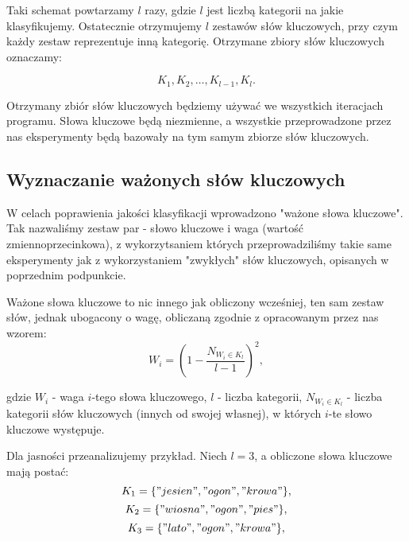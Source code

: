 \documentclass{classrep}
\begin{document}
Taki schemat powtarzamy $l$ razy, gdzie $l$ jest liczbą kategorii na jakie klasyfikujemy. Ostatecznie otrzymujemy $l$ zestawów słów kluczowych, przy czym każdy zestaw reprezentuje inną kategorię. Otrzymane zbiory słów kluczowych oznaczamy:

\begin{equation}
            K_{1}, K_{2}, \ldots , K_{l-1}, K_{l}.
 \end{equation}	

Otrzymany zbiór słów kluczowych będziemy używać we wszystkich iteracjach programu. Słowa kluczowe będą niezmienne, a wszystkie przeprowadzone przez nas eksperymenty będą bazowały na tym samym zbiorze słów kluczowych.

\subsection{Wyznaczanie ważonych słów kluczowych}

W celach poprawienia jakości klasyfikacji wprowadzono "ważone słowa kluczowe". Tak nazwaliśmy zestaw par - słowo kluczowe i waga (wartość zmiennoprzecinkowa), z wykorzytsaniem których przeprowadziliśmy takie same eksperymenty jak z wykorzystaniem "zwykłych" słów kluczowych, opisanych w poprzednim podpunkcie. \newline

Ważone słowa kluczowe to nic innego jak obliczony wcześniej, ten sam zestaw słów, jednak ubogacony o wagę, obliczaną zgodnie z opracowanym przez nas wzorem:
\begin{equation}
            W_{i} = \left({1 - \frac{N_{W_{i} \in K_{l}}}{l - 1}}\right)^2,
 \end{equation}	

gdzie $W_{i}$ - waga $i$-tego słowa kluczowego, $l$ - liczba kategorii, $N_{W_{i} \in K_{l}}$ - liczba kategorii słów kluczowych (innych od swojej własnej), w których $i$-te słowo kluczowe występuje. \newline

Dla jasności przeanalizujemy przykład. Niech $l = 3$, a obliczone słowa kluczowe mają postać:\newline
\begin{equation}
            K_{1} = \{{"jesien", "ogon", "krowa"}\},
\end{equation}
\begin{equation}
            K_{2} =\{{"wiosna", "ogon", "pies"}\},
\end{equation}	
\begin{equation}
            K_{3} = \{{"lato", "ogon", "krowa"}\},
\end{equation}	
\end{document}
